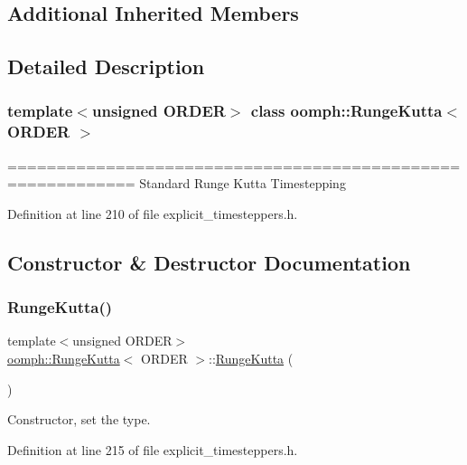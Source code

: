 \subsection*{Additional Inherited Members}


\subsection{Detailed Description}
\subsubsection*{template$<$unsigned O\+R\+D\+ER$>$\newline
class oomph\+::\+Runge\+Kutta$<$ O\+R\+D\+E\+R $>$}

=========================================================== Standard Runge Kutta Timestepping 

Definition at line 210 of file explicit\+\_\+timesteppers.\+h.



\subsection{Constructor \& Destructor Documentation}
\mbox{\label{classoomph_1_1RungeKutta_a31a3f1886f1243e7a7b9fb10f999a017}} 
\subsubsection{\texorpdfstring{Runge\+Kutta()}{RungeKutta()}\hspace{0.1cm}{\footnotesize\ttfamily [1/2]}}
{\footnotesize\ttfamily template$<$unsigned O\+R\+D\+ER$>$ \\
\hyperlink{classoomph_1_1RungeKutta}{oomph\+::\+Runge\+Kutta}$<$ O\+R\+D\+ER $>$\+::\hyperlink{classoomph_1_1RungeKutta}{Runge\+Kutta} (\begin{DoxyParamCaption}{ }\end{DoxyParamCaption})\hspace{0.3cm}{\ttfamily [inline]}}



Constructor, set the type. 



Definition at line 215 of file explicit\+\_\+timesteppers.\+h.


